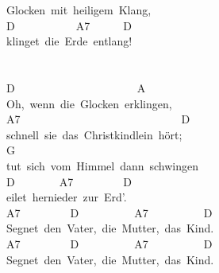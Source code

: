 \documentclass[]{book}
\begin{document}
Glocken~mit~heiligem~Klang,\\
D~~~~~~~~~~~A7~~~~~~D\\
klinget~die~Erde~entlang!\\
~\\
\hspace*{0.333em}\\
D~~~~~~~~~~~~~~~~~~~~~~A\\
Oh,~wenn~die~Glocken~erklingen,\\
A7~~~~~~~~~~~~~~~~~~~~~~~~~~~~~D\\
schnell~sie~das~Christkindlein~hört;\\
\hspace*{0.333em}\hspace*{0.333em}\hspace*{0.333em}\hspace*{0.333em}\hspace*{0.333em}\hspace*{0.333em}\hspace*{0.333em}\hspace*{0.333em}\hspace*{0.333em}\hspace*{0.333em}\hspace*{0.333em}\hspace*{0.333em}\hspace*{0.333em}\hspace*{0.333em}\hspace*{0.333em}\hspace*{0.333em}\hspace*{0.333em}\hspace*{0.333em}\hspace*{0.333em}\hspace*{0.333em}\hspace*{0.333em}\hspace*{0.333em}\hspace*{0.333em}\hspace*{0.333em}\hspace*{0.333em}G\\
tut~sich~vom~Himmel~dann~schwingen\\
D~~~~~~~~A7~~~~~~~~~D\\
eilet~hernieder~zur~Erd'.\\
A7~~~~~~~~~D~~~~~~~~~~A7~~~~~~~~~~D\\
Segnet~den~Vater,~die~Mutter,~das~Kind.\\
A7~~~~~~~~~D~~~~~~~~~~A7~~~~~~~~~~D\\
Segnet~den~Vater,~die~Mutter,~das~Kind.\\
\end{document}
